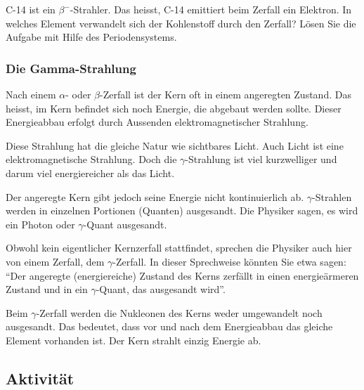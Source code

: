 \documentclass[12pt,a4paper,twoside]{article}
\begin{document}
 


\begin{aufgabe}
C-14 ist ein $\beta^-$-Strahler. Das heisst, C-14 emittiert beim Zerfall ein Elektron.
In welches Element verwandelt sich der Kohlenstoff durch den Zerfall?
Lösen Sie die Aufgabe mit Hilfe des Periodensystems. 
\end{aufgabe}



\subsubsection*{Die Gamma-Strahlung}
Nach einem $\alpha$- oder $\beta$-Zerfall ist der Kern oft in einem angeregten Zustand.
Das heisst, im Kern befindet sich noch Energie, die abgebaut werden sollte.
Dieser Energieabbau erfolgt durch Aussenden elektromagnetischer Strahlung.

Diese Strahlung hat die gleiche Natur wie sichtbares Licht. 
Auch Licht ist eine elektromagnetische Strahlung. 
Doch die $\gamma$-Strahlung ist viel kurzwelliger und darum viel energiereicher als das Licht.

Der angeregte Kern gibt jedoch seine Energie nicht kontinuierlich ab. $\gamma$-Strahlen 
werden in einzelnen Portionen (Quanten) ausgesandt.
Die Physiker sagen, es wird ein Photon oder $\gamma$-Quant ausgesandt.

 


Obwohl kein eigentlicher Kernzerfall stattfindet, sprechen die Physiker auch hier von einem Zerfall,
dem $\gamma$-Zerfall. In dieser Sprechweise könnten Sie etwa sagen: 
``Der angeregte (energiereiche) Zustand des Kerns zerfällt in einen energieärmeren Zustand und in ein $\gamma$-Quant,
das ausgesandt wird''.

Beim $\gamma$-Zerfall werden die Nukleonen des Kerns weder umgewandelt noch ausgesandt.
Das bedeutet, dass vor und nach dem Energieabbau das gleiche Element vorhanden ist. Der Kern strahlt einzig Energie ab.


\subsection*{Aktivität}
\end{document}
